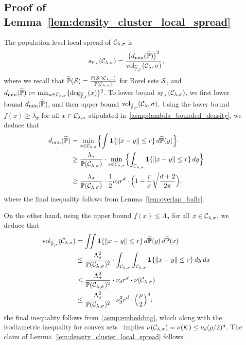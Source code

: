 \subsection{Proof of Lemma~\ref{lem:density_cluster_local_spread}}
\label{subsec:density_cluster_local_spread}
The population-level local spread of $\mathcal{C}_{\lambda,\sigma}$ is
\begin{equation*}
s_{\mathbb{P},r}(\mathcal{C}_{\lambda,\sigma}) = \frac{\bigl(d_{\min}(\widetilde{\mathbb{P}})\bigr)^2}{\mathrm{vol}_{\widetilde{\mathbb{P}},r}(\mathcal{C}_{\lambda},\sigma)},
\end{equation*}
where we recall that $\widetilde{\mathbb{P}}(\mathcal{S}) = \frac{\mathbb{P}(\mathcal{S} \cap \mathcal{C}_{\lambda,\sigma})}{\mathbb{P}(\mathcal{C}_{\lambda,\sigma})}$ for Borel sets $\mathcal{S}$, and $d_{\min}(\widetilde{\mathbb{P}}) := \min_{x \in \mathcal{C}_{\lambda,\sigma}}\{\deg_{\widetilde{\mathbb{P}},r}(x)\}^2$. To lower bound $s_{\mathbb{P},r}(\mathcal{C}_{\lambda,\sigma})$, we first lower bound $d_{\min}(\widetilde{\mathbb{P}})$, and then upper bound $\mathrm{vol}_{\widetilde{\mathbb{P}},r}(\mathcal{C}_{\lambda},\sigma)$. Using the lower bound $f(x) \geq \lambda_{\sigma}$ for all $x \in \mathcal{C}_{\lambda,\sigma}$ stipulated in~\ref{asmp:lambda_bounded_density}, we deduce that
\begin{align*}
d_{\min}(\widetilde{\mathbb{P}}) & = \min_{x \in \mathcal{C}_{\lambda,\sigma}} \Bigl\{ \int \mathbf{1}\{\|x - y\| \leq r\} \,d\widetilde{\mathbb{P}}(y) \Bigr\} \\
& \geq \frac{\lambda_{\sigma}}{\mathbb{P}(\mathcal{C}_{\lambda,\sigma})} \cdot \min_{x \in \mathcal{C}_{\lambda,\sigma}} \Bigl\{ \int_{\mathcal{C}_{\lambda,\sigma}} \mathbf{1}\{\|x - y\| \leq r\} \,dy \Bigr\} \\
& \geq \frac{\lambda_{\sigma}}{\mathbb{P}(\mathcal{C}_{\lambda,\sigma})} \cdot \frac{1}{2}\nu_dr^d \cdot \Bigl(1 - \frac{r}{\sigma} \sqrt{\frac{d + 2}{2\pi}}\Bigr),
\end{align*}
where the final inequality follows from Lemma~\ref{lem:overlap_balls}. 

On the other hand, using the upper bound $f(x) \leq \Lambda_{\sigma}$ for all $x \in \mathcal{C}_{\lambda,\sigma}$, we deduce that
\begin{align*}
\mathrm{vol}_{\widetilde{\mathbb{P}},r}(\mathcal{C}_{\lambda,\sigma}) & = \iint \mathbf{1}\{\|x - y\|\leq r\} \,d\widetilde{\mathbb{P}}(y) \,d\widetilde{\mathbb{P}}(x) \\
& \leq \frac{\Lambda_{\sigma}^2}{\mathbb{P}(\mathcal{C}_{\lambda,\sigma})^2} \cdot \int_{\mathcal{C}_{\lambda,\sigma}} \int_{\mathcal{C}_{\lambda,\sigma}} \mathbf{1}\{\|x - y\|\leq r\} \,dy \,dx \\
& \leq \frac{\Lambda_{\sigma}^2}{\mathbb{P}(\mathcal{C}_{\lambda,\sigma})^2} \cdot \nu_d r^d \cdot \nu(\mathcal{C}_{\lambda,\sigma}) \\
& \leq \frac{\Lambda_{\sigma}^2}{\mathbb{P}(\mathcal{C}_{\lambda,\sigma})^2} \cdot \nu_d^2 r^d  \cdot \Bigl(\frac{\rho}{2}\Bigr)^d;
\end{align*}
the final inequality follows from~\ref{asmp:embedding}, which along with the isodiametric inequality for convex sets~\citep{gruber2007} implies $\nu(\mathcal{C}_{\lambda,\sigma}) = \nu(\mathcal{K}) \leq \nu_d(\rho/2)^d$. The claim of Lemma~\ref{lem:density_cluster_local_spread} follows.

